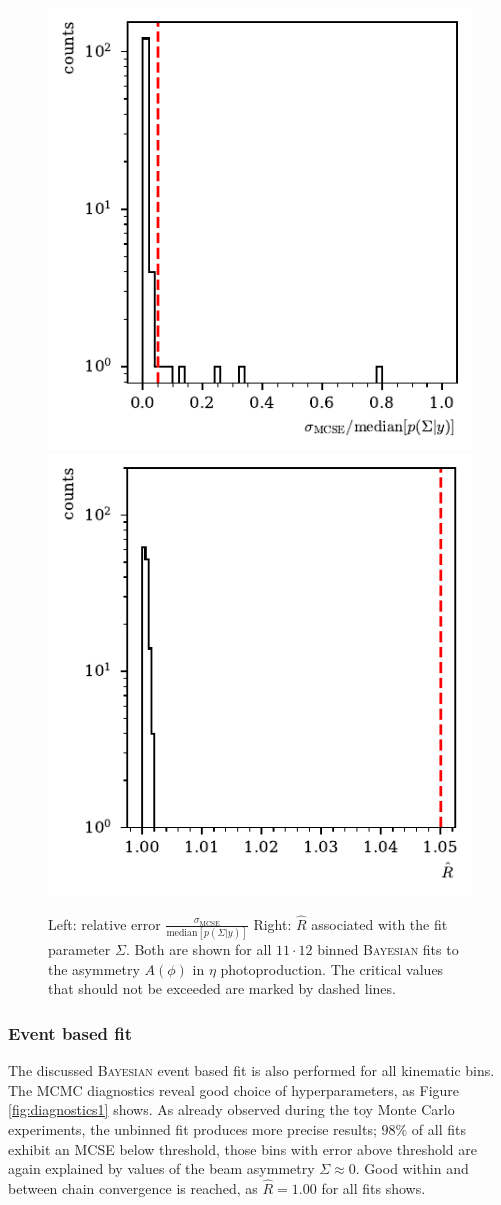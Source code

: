 \begin{figure}[htbp]
	\includegraphics[width=.49\linewidth]{../bayes/realdeal/plots/mcse_hist.pdf}
	\includegraphics[width=.49\linewidth]{../bayes/realdeal/plots/rhat_hist.pdf}
	\caption{ Left: relative error $\frac{\sigma_\text{MCSE}}{\text{median}\left[p\left(\Sigma|y\right)\right]}$ Right: $\widehat{R}$ associated with the fit parameter $\Sigma$. Both are shown for all $11\cdot12$ binned \textsc{Bayesian} fits to the asymmetry $A\left(\phi\right)$ in $\eta$ photoproduction. The critical values that should not be exceeded are marked by dashed lines.}
	\label{fig:diagnostics}
\end{figure}
\subsubsection{Event based fit}
The discussed \textsc{Bayesian} event based fit is also performed for all kinematic bins. The MCMC diagnostics reveal good choice of hyperparameters, as Figure \ref{fig:diagnostics1} shows. As already observed during the toy Monte Carlo experiments, the unbinned fit produces more precise results; $98\%$ of all fits exhibit an MCSE below threshold, those bins with error above threshold are again explained by values of the beam asymmetry $\Sigma\approx0.$ Good within and between chain convergence is reached, as $\widehat{R}=1.00$ for all fits shows.

